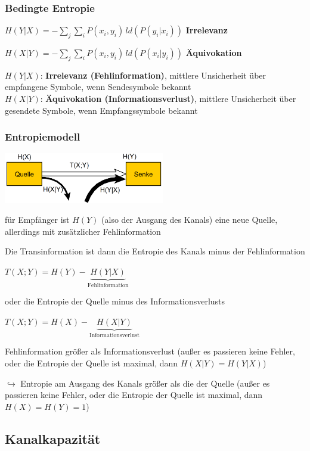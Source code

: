 \subsubsection{Bedingte Entropie}

$\displaystyle{
    H(Y|X) = - \sum_{j} \sum_{i} P(x_i, y_i)\,ld(P(y_i|x_i))
}$\;\; \textbf{Irrelevanz}

$\displaystyle{
    H(X|Y) = - \sum_{j} \sum_{i} P(x_i, y_i)\,ld(P(x_i|y_i))
}$\;\; \textbf{Äquivokation}

$H(Y|X)$: \textbf{Irrelevanz (Fehlinformation)}, mittlere Unsicherheit über empfangene Symbole, wenn Sendesymbole bekannt\\
$H(X|Y)$: \textbf{Äquivokation (Informationsverlust)}, mittlere Unsicherheit über gesendete Symbole, wenn Empfangssymbole bekannt

\subsubsection{Entropiemodell}

\includegraphics[width=7cm]{img/entropiemodell.PNG}

für Empfänger ist $H(Y)$ (also der Ausgang des Kanals) eine neue Quelle, allerdings mit zusätzlicher Fehlinformation

Die Transinformation ist dann die Entropie des Kanals minus der Fehlinformation

$\displaystyle{
    T(X;Y) = H(Y) - \underbrace{H(Y|X)}_{\text{Fehlinformation}}
}$

oder die Entropie der Quelle minus des Informationsverlusts

$\displaystyle{
    T(X;Y) = H(X) - \underbrace{H(X|Y)}_{\text{Informationsverlust}}
}$

Fehlinformation größer als Informationsverlust (außer es passieren keine Fehler,
oder die Entropie der Quelle ist maximal, dann $H(X|Y) = H(Y|X)$)

$\hookrightarrow$ Entropie am Ausgang des Kanals größer als die der Quelle (außer es passieren keine Fehler, oder die
Entropie der Quelle ist maximal, dann $H(X) = H(Y) = 1$)

\subsection{Kanalkapazität}

